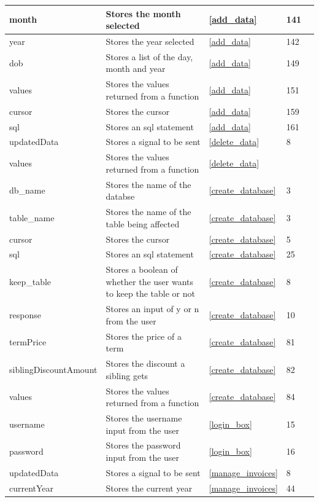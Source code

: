 \begin{center}
\begin{longtable}{|p{2cm}|p{2cm}|p{2cm}|p{2cm}|l}
		month & Stores the month selected & \ref{add_data} & 141 \\ \hline
		year & Stores the year selected & \ref{add_data} & 142 \\ \hline
		dob & Stores a list of the day, month and year & \ref{add_data} & 149 \\ \hline
		values & Stores the values returned from a function & \ref{add_data} & 151 \\ \hline
		cursor & Stores the cursor & \ref{add_data} & 159 \\ \hline
		sql & Stores an sql statement & \ref{add_data} & 161 \\ \hline
		updatedData & Stores a signal to be sent & \ref{delete_data} & 8 \\ \hline
		values & Stores the values returned from a function & \ref{delete_data} &  \\ \hline
		db\_name & Stores the name of the databse & \ref{create_database} & 3 \\ \hline
		table\_name & Stores the name of the table being affected & \ref{create_database} & 3 \\ \hline
		cursor & Stores the cursor & \ref{create_database} & 5 \\ \hline
		sql & Stores an sql statement & \ref{create_database} & 25 \\ \hline
		keep\_table & Stores a boolean of whether the user wants to keep the table or not & \ref{create_database} & 8 \\ \hline
		response & Stores an input of y or n from the user & \ref{create_database} &  10 \\ \hline
		termPrice & Stores the price of a term & \ref{create_database} & 81 \\ \hline
		siblingDiscountAmount & Stores the discount a sibling gets & \ref{create_database} & 82 \\ \hline
		values & Stores the values returned from a function & \ref{create_database} & 84 \\ \hline
		username & Stores the username input from the user & \ref{login_box} & 15 \\ \hline
		password & Stores the password input from the user &  \ref{login_box} & 16 \\ \hline
		updatedData & Stores a signal to be sent & \ref{manage_invoices} & 8 \\ \hline
		currentYear & Stores the current year & \ref{manage_invoices} & 44 \\ \hline

\end{longtable}
\end{center}
